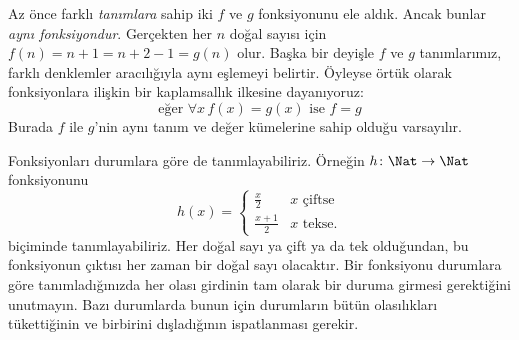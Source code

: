 \documentclass[../../../include/open-logic-section]{subfiles}
\begin{document}
\begin{explain}
Az önce farklı \emph{tanımlara} sahip iki $f$ ve $g$ fonksiyonunu ele aldık.
Ancak bunlar \emph{aynı fonksiyondur}. Gerçekten her $n$ doğal sayısı için
$f(n)=n+1=n+2-1=g(n)$ olur. Başka bir deyişle $f$ ve $g$ tanımlarımız,
farklı denklemler aracılığıyla aynı eşlemeyi belirtir. Öyleyse örtük olarak
fonksiyonlara ilişkin bir kaplamsallık ilkesine dayanıyoruz:
\[
  \text{eğer }\forall x\, f(x) = g(x)\text{ ise }f = g
\]
Burada $f$ ile $g$'nin aynı tanım ve değer kümelerine sahip olduğu
varsayılır.
\end{explain}

\begin{ex}
Fonksiyonları durumlara göre de tanımlayabiliriz. Örneğin
$h \colon \Nat \to \Nat$ fonksiyonunu
\[
h(x) =
\begin{cases}
  \frac{x}{2} & \text{$x$ çiftse} \\
  \frac{x+1}{2} & \text{$x$ tekse.}
\end{cases}
\]
biçiminde tanımlayabiliriz. Her doğal sayı ya çift ya da tek olduğundan, bu
fonksiyonun çıktısı her zaman bir doğal sayı olacaktır. Bir fonksiyonu
durumlara göre tanımladığınızda her olası girdinin tam olarak bir duruma
girmesi gerektiğini unutmayın. Bazı durumlarda bunun için durumların bütün
olasılıkları tükettiğinin ve birbirini dışladığının ispatlanması gerekir.
\end{ex}
\end{document}
